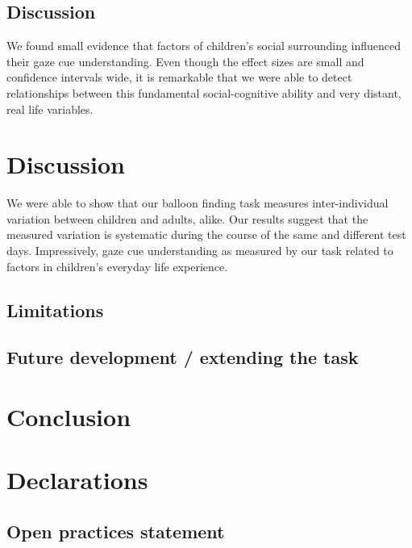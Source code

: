 \documentclass[
  man,floatsintext]{apa6}
\begin{document}
\hypertarget{discussion-2}{%
\subsection{Discussion}\label{discussion-2}}

We found small evidence that factors of children's social surrounding influenced their gaze cue understanding. Even though the effect sizes are small and confidence intervals wide, it is remarkable that we were able to detect relationships between this fundamental social-cognitive ability and very distant, real life variables.

\hypertarget{discussion-3}{%
\section{Discussion}\label{discussion-3}}

We were able to show that our balloon finding task measures inter-individual variation between children and adults, alike. Our results suggest that the measured variation is systematic during the course of the same and different test days. Impressively, gaze cue understanding as measured by our task related to factors in children's everyday life experience.

\hypertarget{limitations}{%
\subsection{Limitations}\label{limitations}}

\hypertarget{future-development-extending-the-task}{%
\subsection{Future development / extending the task}\label{future-development-extending-the-task}}

\hypertarget{conclusion}{%
\section{Conclusion}\label{conclusion}}

\hypertarget{declarations}{%
\section{Declarations}\label{declarations}}

\hypertarget{open-practices-statement}{%
\subsection{Open practices statement}\label{open-practices-statement}}
\end{document}
